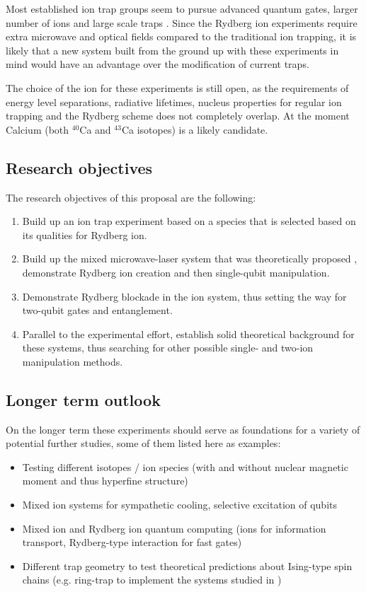 Most established ion trap groups seem to pursue advanced quantum gates, larger number of ions and large scale traps \cite{Kielpinski2002}. Since the Rydberg ion experiments require extra microwave and optical fields compared to the traditional ion trapping, it is likely that a new system built from the ground up with these experiments in mind would have an advantage over the modification of current traps.

The choice of the ion for these experiments is still open, as the requirements of energy level separations, radiative lifetimes, nucleus properties for regular ion trapping and the Rydberg scheme does not completely overlap. At the moment Calcium (both $^{40}$Ca and $^{43}$Ca isotopes) is a likely candidate.

\subsection{Research objectives}
The research objectives of this proposal are the following:
\begin{enumerate}
 \item Build up an ion trap experiment based on a species that is selected based on its qualities for Rydberg ion.
 \item Build up the mixed microwave-laser system that was theoretically proposed \cite{Mueller2008}, demonstrate Rydberg ion creation and then single-qubit manipulation.
 \item Demonstrate Rydberg blockade in the ion system, thus setting the way for two-qubit gates and entanglement.
 \item Parallel to the experimental effort, establish solid theoretical background for these systems, thus searching for other possible single- and two-ion manipulation methods.
\end{enumerate}

\subsection{Longer term outlook}
On the longer term these experiments should serve as foundations for a variety of potential further studies, some of them listed here as examples:
\begin{itemize}
 \item Testing different isotopes / ion species (with and without nuclear magnetic moment and thus hyperfine structure)
 \item Mixed ion systems for sympathetic cooling, selective excitation of qubits
 \item Mixed ion and Rydberg ion quantum computing (ions for information transport, Rydberg-type interaction for fast gates)
 \item Different trap geometry to test theoretical predictions about Ising-type spin chains (e.g. ring-trap \cite{Champenois2010} to implement the systems studied in \cite{Weimer2010})
\end{itemize}
